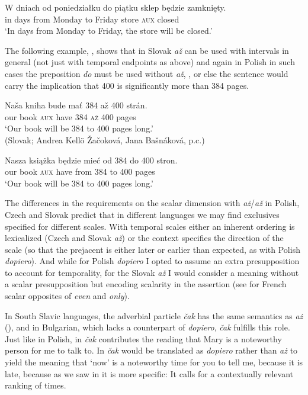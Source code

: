 \documentclass[output=paper,colorlinks,citecolor=brown]{langscibook}
\begin{document}
\ea\label{ex:tom:plfriday}
\gll W dniach od poniedziałku do piątku sklep będzie zamknięty.\\
in days from Monday to Friday store \textsc{aux} closed\\
\glt `In days from Monday to Friday, the store will be closed.'
\z

\noindent The following example, , shows that in Slovak \textit{až} can be used with intervals in general (not just with temporal endpoints as above) and again in Polish in such cases the preposition \textit{do} must be used without \textit{až}, , or else the sentence would carry the implication that 400 is significantly more than 384 pages.

\ea\label{ex:tom:sl2}
\gll Naša kniha bude mať 384 až 400 strán.\\
our book \textsc{aux} have 384 \textsc{až} 400 pages\\
\glt `Our book will be 384 to 400 pages long.'\\\hfill (Slovak; Andrea Kellö Žačoková, Jana Bašnáková, p.c.)
\z

\ea\label{ex:tom:pl400}
\gll Nasza książka będzie mieć od 384 do 400 stron.\\
our book \textsc{aux} have from 384 to 400 pages\\
\glt `Our book will be 384 to 400 pages long.'
\z


\noindent The differences in the requirements on the scalar dimension with \textit{aż}/\textit{až} in Polish, Czech and Slovak predict that in different languages we may find exclusives specified for different scales. With temporal scales either an inherent ordering is lexicalized (Czech and Slovak \textit{až}) or the context specifies the direction of the scale (so that the prejacent is either later or earlier than expected, as with Polish \textit{dopiero}). And while for %
Polish \textit{dopiero} I opted to assume an extra presupposition to account for temporality, for the Slovak \textit{až} I would consider a meaning without a scalar presupposition but encoding scalarity in the assertion (see \citealt{charnavel15} for French scalar opposites of \textit{even} and \textit{only}).

In South Slavic languages, the adverbial particle \textit{čak} has the same semantics as \textit{aż} (\citealt{tomaszewicz13,tomaszewicz13a}), and in Bulgarian, which lacks a counterpart of \textit{dopiero}, \textit{čak} fulfills this role. Just like in Polish, in  \textit{čak} contributes the reading that Mary is a noteworthy person for me to talk to. In  \textit{čak} would be translated as \textit{dopiero} rather than \textit{aż} to yield the meaning that ‘now’ is a noteworthy time for you to tell me, because it is late, because as we saw in  it is more specific: It calls for a contextually relevant ranking of times.
\end{document}
